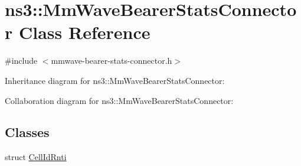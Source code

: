 \hypertarget{classns3_1_1MmWaveBearerStatsConnector}{}\section{ns3\+:\+:Mm\+Wave\+Bearer\+Stats\+Connector Class Reference}
\label{classns3_1_1MmWaveBearerStatsConnector}


{\ttfamily \#include $<$mmwave-\/bearer-\/stats-\/connector.\+h$>$}



Inheritance diagram for ns3\+:\+:Mm\+Wave\+Bearer\+Stats\+Connector\+:


Collaboration diagram for ns3\+:\+:Mm\+Wave\+Bearer\+Stats\+Connector\+:
\subsection*{Classes}
\begin{DoxyCompactItemize}
\item 
struct \hyperlink{structns3_1_1MmWaveBearerStatsConnector_1_1CellIdRnti}{Cell\+Id\+Rnti}
\end{DoxyCompactItemize}
